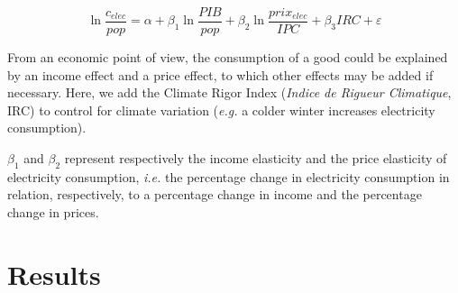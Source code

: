 \begin{equation} \label{eq:reg}
\ln{\frac{c_{elec}}{pop}} = \alpha + \beta_1 \ln{\frac{{PIB}}{pop}} + \beta_2 \ln{\frac{prix_{elec}}{IPC}} + \beta_3 IRC + \varepsilon
\end{equation}

From an economic point of view, the consumption of a good could be explained by an income effect and a price effect, to which other effects may be added if necessary. Here, we add the Climate Rigor Index (\textit{Indice de Rigueur Climatique}, IRC) to control for climate variation (\textit{e.g.} a colder winter increases electricity consumption).

$\beta_1$ and $\beta_2$ represent respectively the income elasticity and the price elasticity of electricity consumption, \textit{i.e.} the percentage change in electricity consumption in relation, respectively, to a percentage change in income and the percentage change in prices. \\


\section{Results}
